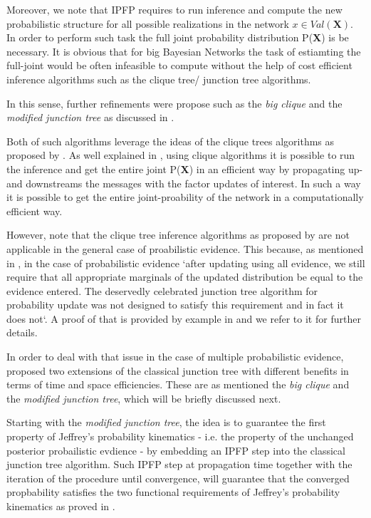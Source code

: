 \documentclass[11pt]{article}
\begin{document}
\begin{article}
Moreover, we note that IPFP requires to run inference and compute the
new probabilistic structure for all possible realizations in the
network \(x \in Val(\textbf{X})\). In order to perform such task the
full joint probability distribution P(\textbf{X}) is be necessary. It
is obvious that for big Bayesian Networks the task of estiamting the
full-joint would be often infeasible to compute without the help of cost
efficient inference algorithms such as the clique tree/ junction tree algorithms.

In this sense, further refinements were propose such as the \emph{big
clique} and the \emph{modified junction tree} as discussed in
\cite{Valtorta_2002}.

Both of such algorithms leverage the ideas of the clique trees
algorithms as proposed by \cite{shafer1990probability}. As well
explained in \cite{koller2009probabilistic}, using clique algorithms
it is possible to run the inference and get the entire joint
P(\textbf{X}) in an efficient way by propagating up- and downstreams
the messages with the factor updates of interest. In such a way it is
possible to get the entire joint-proability of the network in a
computationally efficient way.

However, note that the clique tree inference algorithms as proposed by
\cite{shafer1990probability} are not applicable in the general case of
proabilistic evidence. This because, as mentioned in
\cite{Valtorta_2002}, in the case of probabilistic evidence `after
updating using all evidence, we still require that all appropriate
marginals of the updated distribution be equal to the evidence
entered. The deservedly celebrated junction tree algorithm for
probability update was not designed to satisfy this requirement and in
fact it does not`. A proof of that is provided by example in
\cite{Valtorta_2002} and we refer to it for further details.

In order to deal with that issue in the case of multiple probabilistic evidence,
\cite{Valtorta_2002} proposed two extensions of the classical junction
tree with different benefits in terms of time and space
efficiencies. These are as mentioned the \emph{big clique} and the
\emph{modified junction tree}, which will be briefly discussed next.

Starting with the \emph{modified junction tree}, the idea is to
guarantee the first property of Jeffrey's probability kinematics -
i.e. the property of the unchanged posterior probailistic evdience -
by embedding an IPFP step into the classical junction tree
algorithm. Such IPFP step at propagation time together with the
iteration of the procedure until convergence, will guarantee that the
converged propbability satisfies the two functional requirements of
Jeffrey's probability kinematics as proved in
\cite{csiszar1975divergence}.


\end{article}
\end{document}

